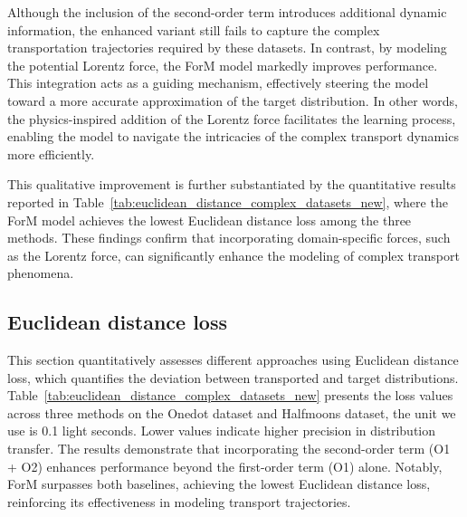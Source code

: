 Although the inclusion of the second-order term introduces additional dynamic information, the enhanced variant still fails to capture the complex transportation trajectories required by these datasets. In contrast, by modeling the potential Lorentz force, the ForM model markedly improves performance. This integration acts as a guiding mechanism, effectively steering the model toward a more accurate approximation of the target distribution. In other words, the physics-inspired addition of the Lorentz force facilitates the learning process, enabling the model to navigate the intricacies of the complex transport dynamics more efficiently.

This qualitative improvement is further substantiated by the quantitative results reported in Table~\ref{tab:euclidean_distance_complex_datasets_new}, where the ForM model achieves the lowest Euclidean distance loss among the three methods. These findings confirm that incorporating domain-specific forces, such as the Lorentz force, can significantly enhance the modeling of complex transport phenomena.

\subsection{Euclidean distance loss}\label{sec:exp:euclidean_distance_loss}
This section quantitatively assesses different approaches using Euclidean distance loss, which quantifies the deviation between transported and target distributions. Table~\ref{tab:euclidean_distance_complex_datasets_new} presents the loss values across three methods on the Onedot dataset and Halfmoons dataset, the unit we use is 0.1 light seconds. Lower values indicate higher precision in distribution transfer. The results demonstrate that incorporating the second-order term (O1 + O2) enhances performance beyond the first-order term (O1) alone. 
Notably, ForM surpasses both baselines, achieving the lowest Euclidean distance loss, reinforcing its effectiveness in modeling transport trajectories. 

